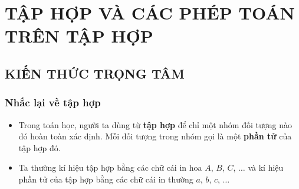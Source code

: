 \newpage
\setcounter{section}{1}
\setcounter{dang}{0}
\def\tenchude{TẬP HỢP VÀ CÁC PHÉP TOÁN TRÊN TẬP HỢP}
\section{TẬP HỢP VÀ CÁC PHÉP TOÁN TRÊN TẬP HỢP}


\subsection{KIẾN THỨC TRỌNG TÂM}
\subsubsection{Nhắc lại về tập hợp}
\begin{khung4}{}
	\begin{itemize}
		\item Trong toán học, người ta dùng từ \textbf{tập hợp} để chỉ một nhóm đối tượng nào đó hoàn toàn xác định. Mỗi đối tượng trong nhóm gọi là một \textbf{phần tử} của tập hợp đó.
		\item Ta thường kí hiệu tập hợp bằng các chữ cái in hoa $A$, $B$, $C$, $\ldots$ và kí hiệu phần tử của tập hợp bằng các chữ cái in thường $a$, $b$, $c$, $\ldots$
	\end{itemize}
\end{khung4}

